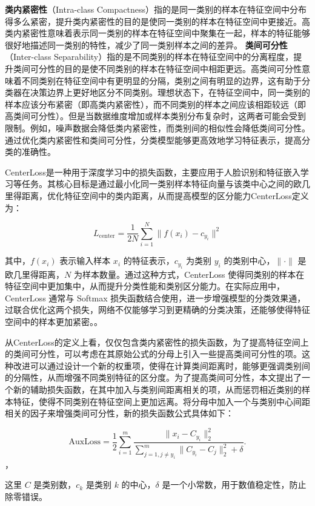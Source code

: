 \textbf{类内紧密性}（Intra-class Compactness）指的是同一类别的样本在特征空间中分布得多么紧密，提升类内紧密性的目的是使同一类别的样本在特征空间中更接近。高类内紧密性意味着表示同一类别的样本在特征空间中聚集在一起，样本的特征能够很好地描述同一类别的特性，减少了同一类别样本之间的差异。 \textbf{类间可分性}（Inter-class Separability）指的是不同类别的样本在特征空间中的分离程度，提升类间可分性的目的是使不同类别的样本在特征空间中相距更远。高类间可分性意味着不同类别在特征空间中有更明显的分隔，类别之间有明显的边界，这有助于分类器在决策边界上更好地区分不同类别。理想状态下，在特征空间中，同一类别的样本应该分布紧密（即高类内紧密性），而不同类别的样本之间应该相距较远（即高类间可分性）。但是当数据维度增加或样本类别分布复杂时，这两者可能会受到限制。例如，噪声数据会降低类内紧密性，而类别间的相似性会降低类间可分性。通过优化类内紧密性和类间可分性，分类模型能够更高效地学习特征表示，提高分类的准确性。



CenterLoss\cite{wen2016discriminative}是一种用于深度学习中的损失函数，主要应用于人脸识别和特征嵌入学习等任务。其核心目标是通过最小化同一类别样本特征向量与该类中心之间的欧几里得距离，优化特征空间中的类内距离，从而提高模型的区分能力CenterLoss定义为：

\[
L_{\text{center}} = \frac{1}{2N} \sum_{i=1}^{N} \| f(x_i) - c_{y_i} \|^2
\]

其中，\( f(x_i) \) 表示输入样本 \( x_i \) 的特征表示，\( c_{y_i} \) 为类别 \( y_i \) 的类别中心，\(\|\cdot\|\) 是欧几里得距离，\( N \) 为样本数量。通过这种方式，CenterLoss 使得同类别的样本在特征空间中更加集中，从而提升分类性能和类别区分能力。在实际应用中，CenterLoss 通常与 Softmax 损失函数结合使用，进一步增强模型的分类效果通，过联合优化这两个损失，网络不仅能够学习到更精确的分类决策，还能够使得特征空间中的样本更加紧密。。

从CenterLoss的定义上看，仅仅包含类内紧密性的损失函数，为了提高特征空间上的类间可分性，可以考虑在其原始公式的分母上引入一些提高类间可分性的项。这种改进可以通过设计一个新的权重项，使得在计算类间距离时，能够更强调类别间的分隔性，从而增强不同类别特征的区分度。为了提高类间可分性，本文提出了一个新的辅助损失函数，在其中加入与类别间距离相关的项，从而惩罚相近类别的样本特征，使得不同类别在特征空间上更加远离。将分母中加入一个与类别中心间距相关的因子来增强类间可分性，新的损失函数公式具体如下：

\[
\text{AuxLoss} = \frac{1}{2} \sum_{i=1}^m \frac{\|x_i - C_{y_i}\|_2^2}{\sum_{j=1, j \neq y_i}^{m} \|C_{y_i} - C_j\|_2^2 + \delta}.
\]，

这里 \( C \) 是类别数，\( c_k \) 是类别 \( k \) 的中心，\( \delta \) 是一个小常数，用于数值稳定性，防止除零错误。

